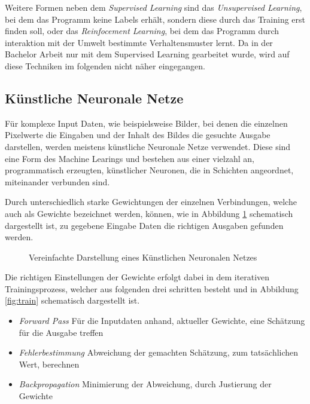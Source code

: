 Weitere Formen neben dem \textit{Supervised Learning} sind das 
\textit{Unsupervised Learning}, bei dem das Programm keine Labels 
erhält, sondern diese durch das Training erst finden 
soll, oder das \textit{Reinfocement Learning}, bei dem das Programm 
durch interaktion mit der Umwelt bestimmte Verhaltensmuster lernt.
Da in der Bachelor Arbeit nur mit dem Supervised Learning 
gearbeitet wurde, wird auf diese Techniken im folgenden nicht 
näher eingegangen.


\subsection{Künstliche Neuronale Netze} \label{subsec:nn}

Für komplexe Input Daten, wie beispielsweise Bilder, bei denen 
die einzelnen Pixelwerte die Eingaben und der Inhalt des Bildes die 
gesuchte Ausgabe darstellen, werden meistens künstliche Neuronale
Netze verwendet.
Diese sind eine Form des Machine Learings und bestehen aus einer 
vielzahl an, programmatisch erzeugten, künstlicher Neuronen, die 
in Schichten angeordnet, miteinander verbunden sind.

Durch unterschiedlich starke Gewichtungen der einzelnen
Verbindungen, welche auch als Gewichte bezeichnet werden, 
können, wie in Abbildung \ref{fig:nn} schematisch dargestellt ist,
zu gegebene Eingabe Daten die richtigen Ausgaben 
gefunden werden.

\vspace{1cm}
\begin{figure}[H]
    \centering
    \def\svgwidth{0.85\columnwidth}
    
    \caption{Vereinfachte Darstellung eines Künstlichen 
    Neuronalen Netzes}
    \label{fig:nn}
\end{figure}
\vspace{1cm}

Die richtigen Einstellungen der Gewichte erfolgt dabei
in dem iterativen Trainingsprozess, welcher aus folgenden 
drei schritten besteht und in Abbildung \ref{fig:train}
schematisch dargestellt ist.

\begin{itemize}
    \item \textit{Forward Pass} Für die Inputdaten anhand,
            aktueller Gewichte, eine Schätzung für die Ausgabe treffen
    \item \textit{Fehlerbestimmung} Abweichung der gemachten Schätzung,
             zum tatsächlichen Wert, berechnen
    \item \textit{Backpropagation} Minimierung der
            Abweichung, durch Justierung der Gewichte
\end{itemize}

